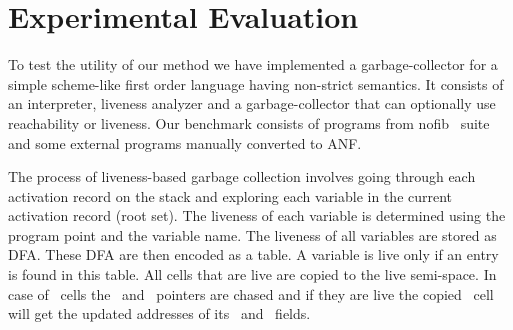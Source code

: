\documentclass[9pt]{sigplanconf}
\newcommand{\comment}[1]{{\color{Myblue}{(#1)}}}
\begin{document}
\section{Experimental Evaluation}
\label{sec:experiments}

To   test  the   utility  of   our  method   we  have   implemented  a
garbage-collector for a simple scheme-like first order language having
non-strict semantics. It consists of an interpreter, liveness analyzer
and a  garbage-collector that can  optionally use  reachability or
liveness.  Our  benchmark consists  of programs  from nofib~\cite{nofib}  suite and
some external programs manually converted to ANF.


The process of liveness-based garbage collection involves going through 
each activation record on the stack and exploring each variable in the 
current activation record (root set). The liveness of each variable is 
determined using the program point and the variable name. The liveness 
of all variables are stored as DFA. These DFA are then encoded as a 
table. A variable is live only if an entry is found in this table.
All cells that are live are copied to the live semi-space. In case of 
\CONS\ cells the \CAR\ and \CDR\ pointers are chased and if they are 
live the copied \CONS\ cell will get the updated addresses of its 
\CAR\ and \CDR\ fields.
\end{document}
